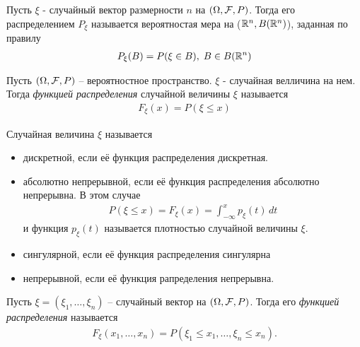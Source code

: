 \begin{definition}
  Пусть $\xi$ - случайный вектор размерности $n$ на $(\Omega, \mathcal{F}, P)$. 
  Тогда его распределением $P_\xi$ называется вероятностая мера на ($\mathbb{R}^n, B(\mathbb{R}^n)$), заданная по правилу
    \begin{align*}
      P_\xi (B) = P(\xi \in B),\; B \in B(\mathbb{R}^n)
    \end{align*}
\end{definition}


\begin{definition}
  Пусть $(\Omega, \mathcal{F}, P)$ -- вероятностное пространство.
  $\xi$ - случайная велличина на нем. Тогда \emph{функцией распределения} случайной величины $\xi$ называется
    \begin{align*}
      F_\xi (x) = P(\xi \leq x)
    \end{align*}
\end{definition}

\begin{definition}
  Случайная величина $\xi$ называется
  \begin{itemize}
    \item 
      дискретной, если её функция распределения дискретная.

    \item 
      абсолютно непрерывной, если её функция распределения абсолютно непрерывна. 
      В этом случае
      \begin{align*}
        P(\xi \leq x) = F_\xi (x) = \int_{-\infty}^{x} p_\xi (t)\, dt
      \end{align*}
      и функция $p_\xi (t)$ называется плотностью случайной величины $\xi$.\\

    \item
      сингулярной, если её функция распределения сингулярна

    \item
      непрерывной, если её функция рапределения непрерывна.
  \end{itemize}
\end{definition}

\begin{definition}
  Пусть $\xi = (\xi_1, \ldots, \xi_n)$ -- случайный вектор на $(\Omega, \mathcal{F}, P)$. 
  Тогда его \emph{функцией распределения} называется 
  \begin{align*}
    F_\xi (x_1, \ldots, x_n) = P(\xi_1 \leq x_1, \ldots, \xi_n \leq x_n).
  \end{align*}
\end{definition}

